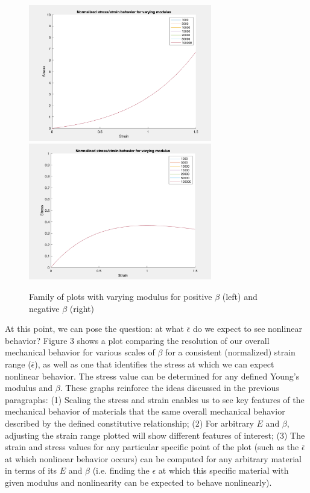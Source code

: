 \documentclass[12pt,american]{article}
\def \ep{\epsilon}
\def \barep{\mbox{{$\overline{\ep}$}}}
\begin{document}
\begin{figure}
    \begin{center}
	\includegraphics[width= 8cm]{./Figures/normalized-pos-beta.png}
	\includegraphics[width= 8cm]{./Figures/normalized-neg-beta.png}
	\caption{Family of plots with varying modulus for positive $\beta$ (left) and negative $\beta$ (right)}
	\end{center}
\end{figure}

\medskip

At this point, we can pose the question: at what $\barep$ do we expect to see nonlinear behavior? Figure 3 shows a plot comparing the resolution of our overall mechanical behavior for various scales of $\beta$ for a consistent (normalized) strain range ($\barep$), as well as one that identifies the stress at which we can expect nonlinear behavior. The stress value can be determined for any defined Young's modulus and $\beta$. These graphs reinforce the ideas discussed in the previous paragraphs: (1) Scaling the stress and strain enables us to see key features of the mechanical behavior of materials that  the same overall mechanical behavior described by the defined constitutive relationship; (2) For arbitrary $E$ and $\beta$, adjusting the strain range plotted will show different features of interest; (3) The strain and stress values for any particular specific point of the plot (such as the $\barep$ at which nonlinear behavior occurs) can be computed for any arbitrary material in terms of its $E$ and $\beta$ (i.e. finding the $\epsilon$ at which this specific material with given modulus and nonlinearity can be expected to behave nonlinearly). 
\end{document}
